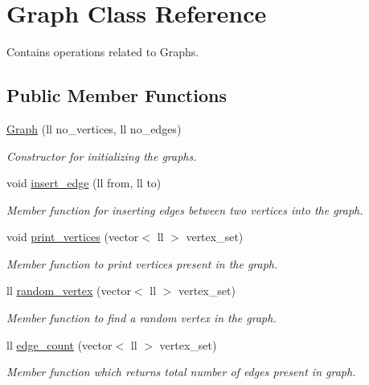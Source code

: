 \hypertarget{classGraph}{}\section{Graph Class Reference}
\label{classGraph}


Contains operations related to Graphs.  


\subsection*{Public Member Functions}
\begin{DoxyCompactItemize}
\item 
\hyperlink{classGraph_ac4a367e9d88770686d6d68b386542418}{Graph} (ll no\+\_\+vertices, ll no\+\_\+edges)
\begin{DoxyCompactList}\small\item\em Constructor for initializing the graphs. \end{DoxyCompactList}\item 
void \hyperlink{classGraph_af8290de63bf9336aea89bf7bca9e054b}{insert\+\_\+edge} (ll from, ll to)
\begin{DoxyCompactList}\small\item\em Member function for inserting edges between two vertices into the graph. \end{DoxyCompactList}\item 
void \hyperlink{classGraph_a2499f1d9980b0f630896d73e714e6603}{print\+\_\+vertices} (vector$<$ ll $>$ vertex\+\_\+set)
\begin{DoxyCompactList}\small\item\em Member function to print vertices present in the graph. \end{DoxyCompactList}\item 
ll \hyperlink{classGraph_ad0fce42e87adc80b81a11baa1331edb9}{random\+\_\+vertex} (vector$<$ ll $>$ vertex\+\_\+set)
\begin{DoxyCompactList}\small\item\em Member function to find a random vertex in the graph. \end{DoxyCompactList}\item 
ll \hyperlink{classGraph_ac63411364245eb9ae4009429a38621f7}{edge\+\_\+count} (vector$<$ ll $>$ vertex\+\_\+set)
\begin{DoxyCompactList}\small\item\em Member function which returns total number of edges present in graph. \end{DoxyCompactList}\item 

\end{DoxyCompactItemize}
